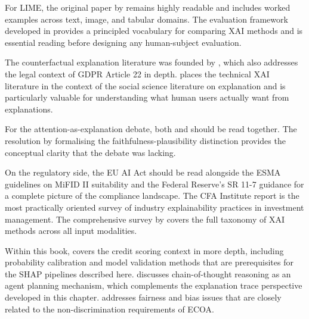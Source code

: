 For LIME, the original paper by \citet{ribeiro2016lime} remains highly readable and
includes worked examples across text, image, and tabular domains. The evaluation
framework developed in \citet{doshivelez2017rigorous} provides a principled vocabulary
for comparing XAI methods and is essential reading before designing any human-subject
evaluation.

The counterfactual explanation literature was founded by \citet{wachter2017counterfactual},
which also addresses the legal context of GDPR Article 22 in depth. \citet{miller2019explanation}
places the technical XAI literature in the context of the social science literature on
explanation and is particularly valuable for understanding what human users actually want
from explanations.

For the attention-as-explanation debate, both \citet{jain2019attention} and
\citet{wiegreffe2019attention} should be read together. The resolution by
\citet{jacovi2020towards} formalising the faithfulness-plausibility distinction provides
the conceptual clarity that the debate was lacking.

On the regulatory side, the EU AI Act \cite{euaiact2024} should be read alongside the
ESMA guidelines on MiFID II suitability \cite{esma2018mifid2} and the Federal Reserve's
SR 11-7 guidance \cite{sr117} for a complete picture of the compliance landscape. The
CFA Institute report \cite{cfainstitute2025xai} is the most practically oriented survey
of industry explainability practices in investment management. The comprehensive survey
by \citet{arrieta2020explainable} covers the full taxonomy of XAI methods across all
input modalities.

Within this book,  covers the credit scoring context in more
depth, including probability calibration and model validation methods that are
prerequisites for the SHAP pipelines described here.  discusses
chain-of-thought reasoning as an agent planning mechanism, which complements the
explanation trace perspective developed in this chapter. 
addresses fairness and bias issues that are closely related to the non-discrimination
requirements of ECOA.
